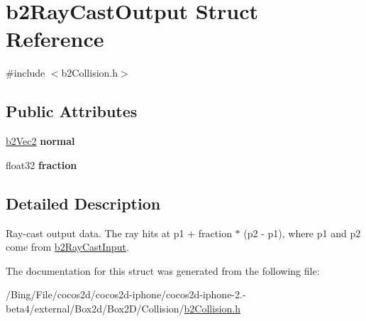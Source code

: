 \hypertarget{structb2_ray_cast_output}{\section{b2\-Ray\-Cast\-Output Struct Reference}
\label{structb2_ray_cast_output}
}


{\ttfamily \#include $<$b2\-Collision.\-h$>$}

\subsection*{Public Attributes}
\begin{DoxyCompactItemize}
\item 
\hypertarget{structb2_ray_cast_output_aa9bbfe75afa23c21e85cb1bd3736529b}{\hyperlink{structb2_vec2}{b2\-Vec2} {\bfseries normal}}\label{structb2_ray_cast_output_aa9bbfe75afa23c21e85cb1bd3736529b}

\item 
\hypertarget{structb2_ray_cast_output_a191c69bb399304bfe30c69e2158b3f29}{float32 {\bfseries fraction}}\label{structb2_ray_cast_output_a191c69bb399304bfe30c69e2158b3f29}

\end{DoxyCompactItemize}


\subsection{Detailed Description}
Ray-\/cast output data. The ray hits at p1 + fraction $\ast$ (p2 -\/ p1), where p1 and p2 come from \hyperlink{structb2_ray_cast_input}{b2\-Ray\-Cast\-Input}. 

The documentation for this struct was generated from the following file\-:\begin{DoxyCompactItemize}
\item 
/\-Bing/\-File/cocos2d/cocos2d-\/iphone/cocos2d-\/iphone-\/2.-\/beta4/external/\-Box2d/\-Box2\-D/\-Collision/\hyperlink{b2_collision_8h}{b2\-Collision.\-h}\end{DoxyCompactItemize}

